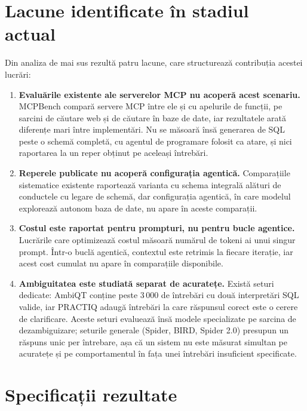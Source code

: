 \documentclass[12pt,a4paper]{report}
\begin{document}
\section{Lacune identificate în stadiul actual}

Din analiza de mai sus rezultă patru lacune, care structurează contribuția
acestei lucrări:

\begin{enumerate}[nosep,leftmargin=*]
  \item \textbf{Evaluările existente ale serverelor MCP nu acoperă acest
    scenariu.} MCPBench \cite{mcpbench} compară servere MCP între ele și cu
    apelurile de funcții, pe sarcini de căutare web și de căutare în baze de
    date, iar rezultatele arată diferențe mari între implementări. Nu se
    măsoară însă generarea de SQL peste o schemă completă, cu agentul de
    programare folosit ca atare, și nici raportarea la un reper obținut pe
    aceleași întrebări.
  \item \textbf{Reperele publicate nu acoperă configurația agentică.}
    Comparațiile sistematice existente \cite{dailsql} raportează varianta cu
    schema integrală alături de conductele cu legare de schemă, dar
    configurația agentică, în care modelul explorează autonom baza de date, nu apare
    în aceste comparații.
  \item \textbf{Costul este raportat pentru prompturi, nu pentru bucle
    agentice.} Lucrările care optimizează costul \cite{dailsql} măsoară
    numărul de tokeni ai unui singur prompt. Într-o buclă agentică, contextul
    este retrimis la fiecare iterație, iar acest cost cumulat nu apare în
    comparațiile disponibile.
  \item \textbf{Ambiguitatea este studiată separat de acuratețe.} Există
    seturi dedicate: AmbiQT \cite{ambiqt} conține peste 3\,000 de întrebări
    cu două interpretări SQL valide, iar PRACTIQ \cite{practiq} adaugă
    întrebări la care răspunsul corect este o cerere de clarificare. Aceste
    seturi evaluează însă modele specializate pe sarcina de dezambiguizare;
    seturile generale (Spider, BIRD, Spider 2.0) presupun un răspuns unic per
    întrebare, așa că un sistem nu este măsurat simultan pe acuratețe și pe
    comportamentul în fața unei întrebări insuficient specificate.
\end{enumerate}

\section{Specificații rezultate}
\end{document}
